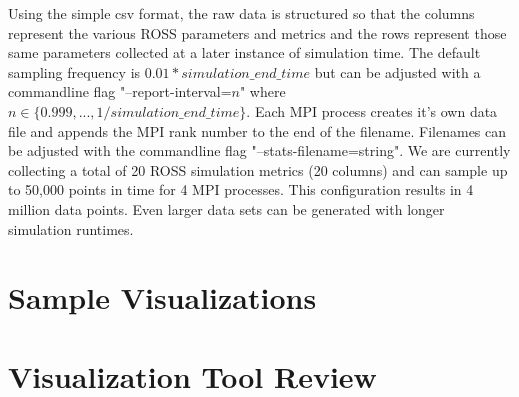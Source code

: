 \documentclass[12pt]{article}
\begin{document}
Using the simple csv format, the raw data is structured so that the columns represent the various ROSS parameters and metrics and the rows represent those same parameters collected at a later instance of simulation time. The default sampling frequency is $0.01*simulation\_end\_time$ but can be adjusted with a commandline flag "--report-interval=$n$" where $n\in \{0.999, ..., 1/simulation\_end\_time\}$. Each MPI process creates it's own data file and appends the MPI rank number to the end of the filename. Filenames can be adjusted with the commandline flag "--stats-filename=string". We are currently collecting a total of 20 ROSS simulation metrics (20 columns) and can sample up to 50,000 points in time for 4 MPI processes. This configuration results in 4 million data points. Even larger data sets can be generated with longer simulation runtimes.

\section{Sample Visualizations}

\section{Visualization Tool Review}



\end{document}

